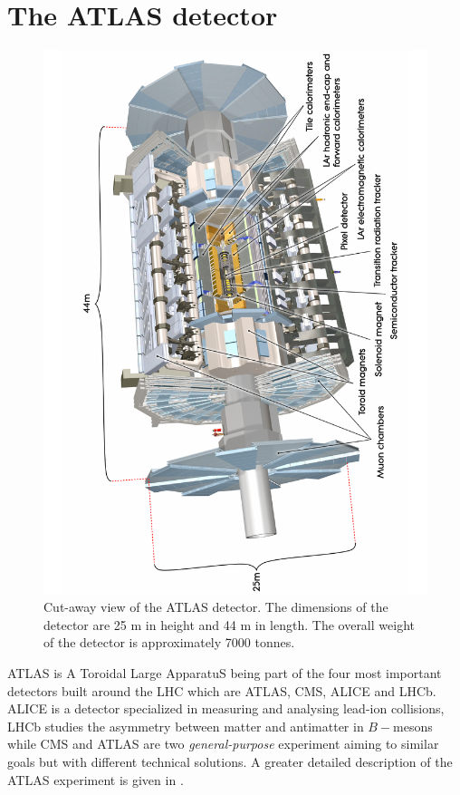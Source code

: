 \section{The ATLAS detector}
\begin{figure}[tp]
	\centering
	\includegraphics[scale=0.4,angle=-90]{LHC_ATLAS/0803012_01}
	\caption{Cut-away view of the ATLAS detector. The dimensions of the detector are 25 m in height and 44 m in length. The overall weight of the detector is approximately 7000 tonnes.}	
	\label{fig:atlas}
\end{figure}
ATLAS is A Toroidal Large ApparatuS being part of the four most important detectors built around the LHC which are ATLAS, CMS, ALICE and LHCb. ALICE is a detector specialized in measuring and analysing lead-ion collisions, LHCb studies the asymmetry between matter and antimatter in $B-$mesons while CMS and ATLAS are two \emph{general-purpose} experiment aiming to similar goals but with different technical solutions. A greater detailed description of the ATLAS experiment is given in \cite{atcollab:jinst}.

